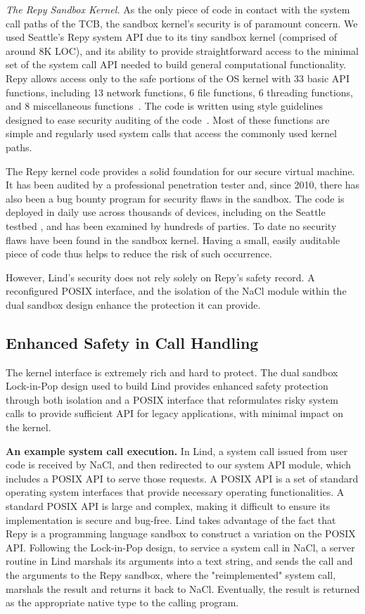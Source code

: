 \textit{The Repy Sandbox Kernel.}
As the only piece of code in contact with the system call paths of the TCB,
the sandbox kernel's security is of paramount concern.
We used Seattle's Repy system API due to its tiny sandbox kernel
(comprised of around 8K LOC), and its ability to provide straightforward
access to the minimal set of the system call API needed to build general
computational functionality. Repy allows
access only to the safe portions of the OS kernel with 33 basic API
functions, including 13 network functions, 6 file functions, 6 threading functions,
and 8 miscellaneous functions~\cite{Repy-10, RepyKernel}. The code is
written using style guidelines designed to ease security auditing
 of the code~\cite{style}. Most of these functions are simple and
regularly used system calls that access the commonly used kernel paths.

The Repy kernel code provides a solid foundation for our secure virtual
machine. It has been audited by a professional penetration tester and, since 2010,
there has also been a bug bounty program for security flaws in the sandbox.
The code is deployed in daily use across thousands of devices,
including on the Seattle testbed \cite{seattle}, and has been examined by
hundreds of parties. To date no security flaws have been found in the sandbox
kernel. Having a small, easily auditable piece of code thus helps to reduce the
risk of such occurrence.

However, Lind's security does not rely solely on Repy's
safety record. A reconfigured POSIX interface, and the isolation of
the NaCl module within the dual sandbox design enhance the protection it can
provide.

\subsection{Enhanced Safety in Call Handling}

The kernel interface is extremely rich and hard to protect.
The dual sandbox Lock-in-Pop design used to build Lind provides enhanced
safety protection through both isolation and a POSIX interface that
reformulates risky system calls to
provide sufficient API for legacy applications, with minimal impact on the kernel.

\textbf{An example system call execution.}
In Lind, a system call issued from user code is
received by NaCl, and then redirected to our system API module, which
includes a POSIX API to serve those requests. A POSIX API is a set of standard
operating system interfaces that provide
necessary operating functionalities. A standard POSIX API is large and complex,
making it difficult to ensure its implementation is secure and bug-free.
Lind takes advantage of the fact that Repy is a programming language sandbox to
construct a variation on the POSIX API. Following the
Lock-in-Pop design, to service a system call in NaCl, a server routine in
Lind marshals its arguments into a text string, and sends the call and the arguments
to the Repy sandbox, where the "reimplemented" system call, marshals the result and
returns it back to NaCl. Eventually, the result is returned as the appropriate
native type to the calling program.

